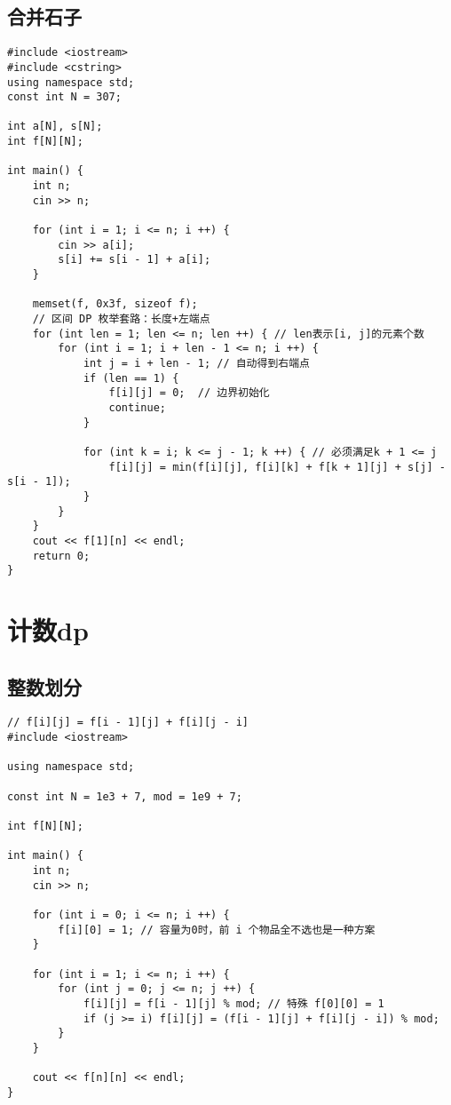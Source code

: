 \documentclass[12pt,a4paper,UTF16]{ctexbook}
\theoremstyle{plain}
\begin{document}
\subsection{合并石子}
\begin{lstlisting}
#include <iostream>
#include <cstring>
using namespace std;
const int N = 307;

int a[N], s[N];
int f[N][N];

int main() {
    int n;
    cin >> n;

    for (int i = 1; i <= n; i ++) {
        cin >> a[i];
        s[i] += s[i - 1] + a[i];
    }

    memset(f, 0x3f, sizeof f);
    // 区间 DP 枚举套路：长度+左端点 
    for (int len = 1; len <= n; len ++) { // len表示[i, j]的元素个数
        for (int i = 1; i + len - 1 <= n; i ++) {
            int j = i + len - 1; // 自动得到右端点
            if (len == 1) {
                f[i][j] = 0;  // 边界初始化
                continue;
            }

            for (int k = i; k <= j - 1; k ++) { // 必须满足k + 1 <= j
                f[i][j] = min(f[i][j], f[i][k] + f[k + 1][j] + s[j] - s[i - 1]);
            }
        }
    }
    cout << f[1][n] << endl;
    return 0;
}
\end{lstlisting}

\section{计数dp}
\subsection{整数划分}
\begin{lstlisting} 
// f[i][j] = f[i - 1][j] + f[i][j - i]
#include <iostream>

using namespace std;

const int N = 1e3 + 7, mod = 1e9 + 7;

int f[N][N];

int main() {
    int n;
    cin >> n;

    for (int i = 0; i <= n; i ++) {
        f[i][0] = 1; // 容量为0时，前 i 个物品全不选也是一种方案
    }

    for (int i = 1; i <= n; i ++) {
        for (int j = 0; j <= n; j ++) {
            f[i][j] = f[i - 1][j] % mod; // 特殊 f[0][0] = 1
            if (j >= i) f[i][j] = (f[i - 1][j] + f[i][j - i]) % mod;
        }
    }

    cout << f[n][n] << endl;
}
\end{lstlisting}
\end{document}
